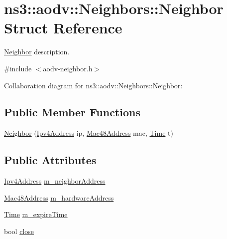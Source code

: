 \hypertarget{structns3_1_1aodv_1_1Neighbors_1_1Neighbor}{}\section{ns3\+:\+:aodv\+:\+:Neighbors\+:\+:Neighbor Struct Reference}
\label{structns3_1_1aodv_1_1Neighbors_1_1Neighbor}


\hyperlink{structns3_1_1aodv_1_1Neighbors_1_1Neighbor}{Neighbor} description.  




{\ttfamily \#include $<$aodv-\/neighbor.\+h$>$}



Collaboration diagram for ns3\+:\+:aodv\+:\+:Neighbors\+:\+:Neighbor\+:
\subsection*{Public Member Functions}
\begin{DoxyCompactItemize}
\item 
\hyperlink{structns3_1_1aodv_1_1Neighbors_1_1Neighbor_ae16864adc59c192eeceda9ec0f0dd7b0}{Neighbor} (\hyperlink{classns3_1_1Ipv4Address}{Ipv4\+Address} ip, \hyperlink{classns3_1_1Mac48Address}{Mac48\+Address} mac, \hyperlink{classns3_1_1Time}{Time} t)
\end{DoxyCompactItemize}
\subsection*{Public Attributes}
\begin{DoxyCompactItemize}
\item 
\hyperlink{classns3_1_1Ipv4Address}{Ipv4\+Address} \hyperlink{structns3_1_1aodv_1_1Neighbors_1_1Neighbor_af59d289e315ff65bfe53bab8bfba406a}{m\+\_\+neighbor\+Address}
\item 
\hyperlink{classns3_1_1Mac48Address}{Mac48\+Address} \hyperlink{structns3_1_1aodv_1_1Neighbors_1_1Neighbor_ae43223600877963521e7704ee516b2cd}{m\+\_\+hardware\+Address}
\item 
\hyperlink{classns3_1_1Time}{Time} \hyperlink{structns3_1_1aodv_1_1Neighbors_1_1Neighbor_af96d607c4c3552b3cbc2e9418c02ea59}{m\+\_\+expire\+Time}
\item 
bool \hyperlink{structns3_1_1aodv_1_1Neighbors_1_1Neighbor_a7ac9d37ff6746231a58b0f55baf3b7f2}{close}
\end{DoxyCompactItemize}


